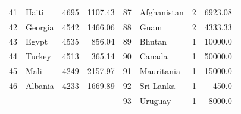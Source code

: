 \begin{longtable}{|c|l|r|r|c|l|r|r|}
	41          & Haiti                 & 4695                               & 1107.43                         & 87          & Afghanistan           & 2                                  & 6923.08                         \\
	42          & Georgia               & 4542                               & 1466.06                         & 88          & Guam                  & 2                                  & 4333.33                         \\
	43          & Egypt                 & 4535                               & 856.04                          & 89          & Bhutan                & 1                                  & 10000.0                         \\
	44          & Turkey                & 4513                               & 365.14                          & 90          & Canada                & 1                                  & 50000.0                         \\
	45          & Mali                  & 4249                               & 2157.97                         & 91          & Mauritania            & 1                                  & 15000.0                         \\
	46          & Albania               & 4233                               & 1669.89                         & 92          & Sri Lanka             & 1                                  & 450.0                           \\
	            &                       &                                    &                                 & 93          & Uruguay               & 1                                  & 8000.0                          \\
\end{longtable}


